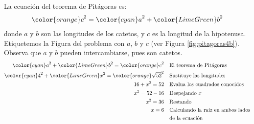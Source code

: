 \begin{solutionbox}{15cm}
\begin{minipage}{0.65\textwidth}
        La ecuación del teorema de Pitágoras es:
        \[{\color{orange}c}^2={\color{cyan}a}^2+{\color{LimeGreen}b}^2\]
        donde $a$ y $b$ son las longitudes de los catetos, y $c$ es la longitud de la hipotenusa.
        Etiquetemos la Figura del problema con $a$, $b$ y $c$ (ver Figura \ref{fig:pitagoras4b}).
        Observa que $a$ y $b$ pueden intercambiarse, pues son catetos.
        \begin{align*}
            {\color{cyan}a}^2+{\color{LimeGreen}b}^2  ={\color{orange}c}^2         & \text{\quad El teorema de Pitágoras}           \\
            {\color{cyan}4}^2+{\color{LimeGreen}x}^2  ={\color{orange}\sqrt{52}}^2 & \text{\quad Sustituye las longitudes}          \\
            16+x^2  =52                                                            & \text{\quad Evalua los cuadrados conocidos}    \\
            x^2=52-16                                                              & \text{\quad Despejando } x                     \\
            x^2=36                                                                 & \text{\quad Restando}                          \\
            x=6                                                                    & \text{\quad Calculando la raíz en ambos lados} \\
                                                                                   & \text{\quad de la ecuación}                    \\
        \end{align*}
    \end{minipage}
\end{solutionbox}
